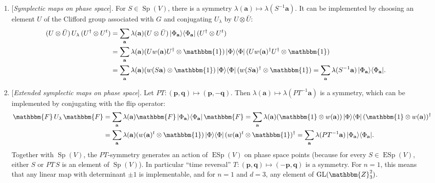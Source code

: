 \documentclass[aps,nofootinbib,floatfix,a4paper]{revtex4}
\newcommand{\1}{\mbox{$\mathbf{1}$}}
\def\ZZ{\mathbbm{Z}}
\def\FF{\mathbbm{F}}
\def\Id{\mathbbm{1}}
\DeclareMathOperator{\Sp}{Sp}
\DeclareMathOperator{\ESp}{ESp}
\DeclareMathOperator{\GL}{GL}
\renewcommand{\vec}{\mathbf}
\begin{document}
\begin{enumerate}

	\item
		{}[\emph{Symplectic maps on phase space}].
		For 
		$S\in \Sp(V)$,
		there is a symmetry 
		$\lambda(\vec a) \mapsto \lambda(S^{-1}\vec a)$.
		It can be implemented by choosing an element $U$ of the Clifford group associated with $G$ and conjugating $U_\lambda$ by $U\otimes \bar U$:
		\begin{align*}
			(U \otimes \bar U) \, U_\lambda \, (U^\dagger \otimes U^t)
			&=
			\sum_{\vec a}
			\lambda(\vec a) 
			(U \otimes \bar U) \, |\Phi_{\vec a}\rangle\langle\Phi_{\vec a}| \, (U^\dagger \otimes U^t)
			\\
			&=
			\sum_{\vec a}
			\lambda(\vec a) 
			(U w(\vec a) U^\dagger \otimes \Id) \, |\Phi\rangle\langle\Phi| \, (U w(\vec a)^\dagger U^\dagger \otimes \Id)  %
		\\
		&=
			\sum_{\vec a}
			\lambda(\vec a) 
			(w(S\vec a) \otimes \Id) \, |\Phi\rangle\langle\Phi| \, ( w(S\vec a)^\dagger \otimes \Id)
		=
			\sum_{\vec a}
			\lambda(S^{-1} \vec a) 
			\, |\Phi_{\vec a}\rangle\langle\Phi_{\vec a}|.
		\end{align*}

	\item
		{}[\emph{Extended symplectic maps on phase space}].\label{itm:extended}
		Let $PT: (\vec p, \vec q) \mapsto (\vec p, -\vec q)$.
		Then
		$\lambda(\vec a) \mapsto \lambda(PT^{-1}\vec a)$ is a symmetry, which can be implemented by conjugating with the flip operator:
		\begin{align}\label{eqn:pt}
			\begin{split}
			\FF \, U_\lambda \, \FF
			&=
			\sum_{\vec a}
			\lambda(\vec a) 
			\FF
			\, |\Phi_{\vec a}\rangle\langle\Phi_{\vec a}| \, 
			\FF
			=
			\sum_{\vec a}
			\lambda(\vec a) 
			(\Id\otimes w(\vec a) ) \, |\Phi\rangle\langle\Phi| \, (\Id \otimes w(\vec a))^\dagger  %
		\\
		&=
			\sum_{\vec a}
			\lambda(\vec a) 
			(w(\vec a)^t \otimes \Id) \, |\Phi\rangle\langle\Phi| \, ( w(\vec a)^t \otimes \Id)^\dagger 
		=
			\sum_{\vec a}
			\lambda(PT^{-1} \vec a) 
			\, |\Phi_{\vec a}\rangle\langle\Phi_{\vec a}|.
		\end{split}
		\end{align}
		Together with $\Sp(V)$, the $PT$-symmetry generates an action of $\ESp(V)$ on phase space points (because for every $S\in \ESp(V)$, either $S$ or $PT\,S$ is an element of $\Sp(V)$).
		In particular ``time reversal'' $T: (\vec p, \vec q)\mapsto (-\vec p, \vec q)$ is a symmetry.
		For $n=1$, this means that any linear map with determinant $\pm1$ is implementable,
		and for $n=1$ and $d=3$, any element of $\GL(\ZZ_3^2)$.



\end{enumerate}
\end{document}
